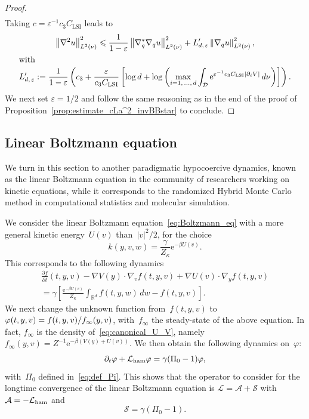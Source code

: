 \documentclass[10pt]{amsart}
\theoremstyle{definition}\newtheorem{defi}[theo]{Definition}\newtheorem{rema}[theo]{Remark}\newtheorem{exam}[theo]{Example}\newtheorem{exem}[theo]{Example}\newtheorem{nota}[theo]{Notation}
\newcommand{\rme}{\mathrm{e}}
\newcommand{\LSI}{\mathrm{LSI}}
\newcommand{\cL}{\mathcal{L}}
\newcommand{\cLs}{\mathcal{S}}
\newcommand{\cLa}{\mathcal{A}}
\newcommand{\cD}{\mathcal{D}}
\newcommand{\R}{\mathbb{R}}
\newcommand{\cLham}{\mathcal{L}_{\rm ham}}
\newcommand{\eps}{\varepsilon}
\renewcommand{\leq}{\leqslant}
\begin{document}
\begin{proof}
\begin{multline}
\end{multline}
Taking $c = \varepsilon^{-1}c_3 C_{\LSI}$ leads to
\begin{gather*}
\left\|\nabla^2 u\right\|_{L^2(\nu)}^2 \leq \frac{1}{1-\varepsilon}\left\|\nabla_q^{*}\nabla_q u \right\|_{L^2(\nu)}^2 + L'_{d,\, \varepsilon}\left\|\nabla_q u\right\|_{L^2(\nu)}^2,
\\
\intertext{with}
L'_{d,\,\varepsilon} := \frac{1}{1-\varepsilon}\left(c_3 + \frac{\varepsilon}{c_3 C_{\LSI}}\left[\log d + \log\left(\max_{i=1,\,\dots,\,d} \int_\cD \rme^{\varepsilon^{-1}c_3 C_{\LSI}\left|\partial_i V\right|} \, d\nu \right)\right]\right).
\end{gather*}
We next set $\eps = 1/2$ and follow the same reasoning as in the end of the proof of Proposition~\ref{prop:estimate_cLa^2_invBBstar} to conclude.
\end{proof}

\subsection{Linear Boltzmann equation}\label{sec:PDMP}

We turn in this section to another paradigmatic hypocoercive dynamics, known as the linear Boltzmann equation in the community of researchers working on kinetic equations, while it corresponds to the randomized Hybrid Monte Carlo method in computational statistics and molecular simulation.

We consider the linear Boltzmann equation~\eqref{eq:Boltzmann_eq} with a more general kinetic energy~$U(v)$ than~$|v|^2/2$, for the choice
\[
k(y,v,w) = \frac{\gamma}{Z_\kappa} \rme^{-\beta U(v)}.
\]
This corresponds to the following dynamics
\begin{multline*}
\frac{\partial f}{\partial t}(t,y,v) - \nabla V(y) \cdot \nabla_v f(t,y,v) + \nabla U(v) \cdot\nabla_y f(t,y,v) \\
 = \gamma \left[\frac{\rme^{-\beta U(v)}}{Z_\kappa} \int_{\R^d} f(t,y,w) \, dw - f(t,y,v)\right].
\end{multline*}
We next change the unknown function from~$f(t,y,v)$ to~$\varphi(t,y,v) = f(t,y,v) /\linebreak f_\infty(y,v)$, with~$f_\infty$ the steady-state of the above equation. In fact, $f_\infty$ is the density of~\eqref{eq:canonical_U_V}, namely $f_\infty(y,v) = Z^{-1} \rme^{-\beta (V(y)+U(v))}$. We then obtain the following dynamics on~$\varphi$:
\[
\partial_t \varphi + \cLham \varphi = \gamma(\Pi_0-1)\varphi,
\]
with~$\Pi_0$ defined in~\eqref{eq:def_Pi}. This shows that the operator to consider for the longtime convergence of the linear Boltzmann equation is $\cL = \cLa + \cLs$ with $\cLa = -\cLham$ and
\begin{equation}\label{eq:LFD_PDMP}
\cLs = \gamma(\Pi_0-1).
\end{equation}
\end{document}

